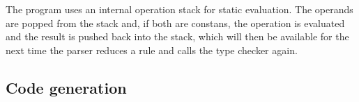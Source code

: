 The program uses an internal operation stack for static evaluation.
The operands are popped from the stack and, if both are constans,
the operation is evaluated and the result is pushed back into the
stack, which will then be available for the next time the parser
reduces a rule and calls the type checker again.

\subsection{Code generation}
